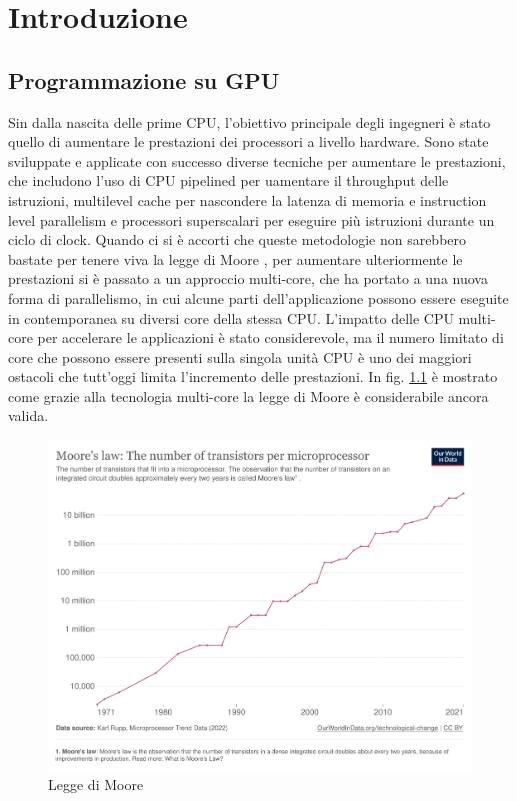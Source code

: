 \chapter{Introduzione}
\label{sec:intro}


\section[Programmazione su GPU]{Programmazione su GPU}

Sin dalla nascita delle prime \gls{CPU}, l'obiettivo principale degli ingegneri è stato quello di aumentare le prestazioni dei processori a livello hardware. Sono state sviluppate e applicate con successo diverse tecniche per aumentare le prestazioni, che includono l'uso di CPU pipelined per uamentare il throughput delle istruzioni, multilevel cache per nascondere la latenza di memoria e instruction level parallelism e processori superscalari per eseguire più istruzioni durante un ciclo di clock.
Quando ci si è accorti che queste metodologie non sarebbero bastate per tenere viva la legge di Moore \cite[]{Moore:law}, per aumentare ulteriormente le prestazioni si è passato a un approccio multi-core, che ha portato a una nuova forma di parallelismo, in cui alcune parti dell'applicazione possono essere eseguite in contemporanea su diversi core della stessa CPU. L'impatto delle CPU multi-core per accelerare le applicazioni è stato considerevole, ma il numero limitato di core che possono essere presenti sulla singola unità CPU è uno dei maggiori ostacoli che tutt'oggi limita l'incremento delle prestazioni. In fig. \ref{fig:moore_law} è mostrato come grazie alla tecnologia multi-core la legge di Moore è considerabile ancora valida.

\begin{figure}[ht]
\centering
\includegraphics[width=.9\linewidth]{images/chapter1/moore_law2.png}
\caption{Legge di Moore}
\label{fig:moore_law}
\end{figure}


